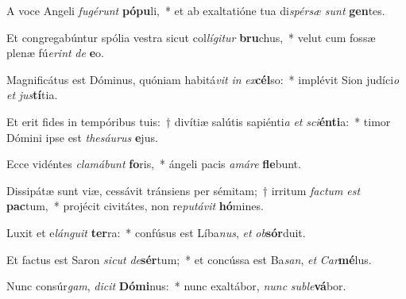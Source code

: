 \item A voce Angeli \textit{fu}\textit{gé}\textit{runt} \textbf{pó}\textbf{pu}li,~* et ab exaltatióne tua di\textit{spér}\textit{sæ} \textit{sunt} \textbf{gen}tes.
\item Et congregabúntur spólia vestra sicut col\textit{lí}\textit{gi}\textit{tur} \textbf{bru}chus,~* velut cum fossæ plenæ fú\textit{e}\textit{rint} \textit{de} \textbf{e}o.
\item Magnificátus est Dóminus, quóniam habitá\textit{vit} \textit{in} \textit{ex}\textbf{cél}so:~* implévit Sion judíci\textit{o} \textit{et} \textit{jus}\textbf{tí}tia.
\item Et erit fides in tempóribus tuis:~† divítiæ salútis sapiénti\textit{a} \textit{et} \textit{sci}\textbf{én}\textbf{ti}a:~* timor Dómini ipse est \textit{the}\textit{sáu}\textit{rus} \textbf{e}jus.
\item Ecce vidéntes \textit{cla}\textit{má}\textit{bunt} \textbf{fo}ris,~* ángeli pacis \textit{a}\textit{má}\textit{re} \textbf{fle}bunt.
\item Dissipátæ sunt viæ, cessávit tránsiens per sémitam;~† irritum \textit{fac}\textit{tum} \textit{est} \textbf{pac}tum,~* projécit civitátes, non re\textit{pu}\textit{tá}\textit{vit} \textbf{hó}mines.
\item Luxit et e\textit{lán}\textit{gu}\textit{it} \textbf{ter}ra:~* confúsus est Líba\textit{nus}, \textit{et} \textit{ob}\textbf{sór}duit.
\item Et factus est Saron \textit{sic}\textit{ut} \textit{de}\textbf{sér}tum;~* et concússa est Ba\textit{san}, \textit{et} \textit{Car}\textbf{mé}lus.
\item Nunc consúr\textit{gam}, \textit{di}\textit{cit} \textbf{Dó}\textbf{mi}nus:~* nunc exaltábor, \textit{nunc} \textit{sub}\textit{le}\textbf{vá}bor.
